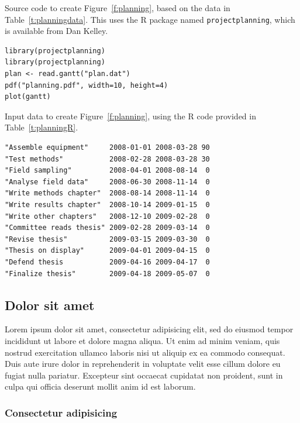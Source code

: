 \documentclass{thesis_proposal}
\begin{document}
\begin{table}[tp]
    \caption{\label{t:planningR}Source code to create
      Figure~\ref{f:planning}, based on the data in
      Table~\ref{t:planningdata}.  This uses the R package
      named \texttt{projectplanning}, which is available from Dan Kelley.}
  \begin{verbatim}
library(projectplanning)
library(projectplanning)
plan <- read.gantt("plan.dat")
pdf("planning.pdf", width=10, height=4)
plot(gantt)
  \end{verbatim}
\end{table}


\begin{table}[tp]
    \caption{\label{t:planningdata}Input data to create
      Figure~\ref{f:planning}, using the R code provided
      in Table~\ref{t:planningR}.
}
  \begin{verbatim}
"Assemble equipment"     2008-01-01 2008-03-28 90
"Test methods"           2008-02-28 2008-03-28 30
"Field sampling"         2008-04-01 2008-08-14  0
"Analyse field data"     2008-06-30 2008-11-14  0
"Write methods chapter"  2008-08-14 2008-11-14  0
"Write results chapter"  2008-10-14 2009-01-15  0
"Write other chapters"   2008-12-10 2009-02-28  0
"Committee reads thesis" 2009-02-28 2009-03-14  0
"Revise thesis"          2009-03-15 2009-03-30  0
"Thesis on display"      2009-04-01 2009-04-15  0
"Defend thesis           2009-04-16 2009-04-17  0
"Finalize thesis"        2009-04-18 2009-05-07  0
  \end{verbatim}
\end{table}


\subsection{Dolor sit amet}

Lorem ipsum dolor sit amet, consectetur adipisicing elit, sed do
eiusmod tempor incididunt ut labore et dolore magna aliqua. Ut enim ad
minim veniam, quis nostrud exercitation ullamco laboris nisi ut
aliquip ex ea commodo consequat. Duis aute irure dolor in
reprehenderit in voluptate velit esse cillum dolore eu fugiat nulla
pariatur. Excepteur sint occaecat cupidatat non proident, sunt in
culpa qui officia deserunt mollit anim id est laborum.

\subsubsection{Consectetur adipisicing}
\end{document}
